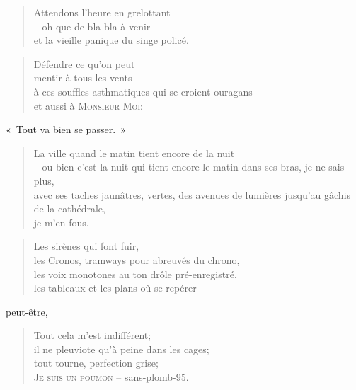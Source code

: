   \begin{verse}
    Attendons l’heure en grelottant\\
    -- oh que de bla bla à venir --\\
    et la vieille panique du singe policé.
  \end{verse}
  \begin{verse}
    Défendre ce qu’on peut\\
    mentir à tous les vents\\
    à ces souffles asthmatiques qui se croient ouragans\\
    et aussi à \textsc{Monsieur Moi}:
  \end{verse}
  \begin{center}
    «~Tout va bien se passer.~»
  \end{center}
  \begin{verse}
    La ville quand le matin tient encore de la nuit \\
    -- ou bien c’est la nuit qui tient encore le matin dans ses bras, je ne sais plus,\\
    avec ses taches jaunâtres, vertes, des avenues de lumières jusqu’au gâchis de la cathédrale,\\
    je m’en fous.
  \end{verse}
  \begin{verse}
    Les sirènes qui font fuir,\\
    les Cronos, tramways pour abreuvés du chrono,\\
    les voix monotones au ton drôle pré-enregistré,\\
    les tableaux et les plans où se repérer
  \end{verse}
  \begin{center}
    peut-être,
  \end{center}
  \begin{verse}
    Tout cela m’est indifférent;\\
    il ne pleuviote qu’à peine dans les cages;\\
    tout tourne, perfection grise;\\
    \textsc{Je suis un poumon} -- sans-plomb-95.\\
  \end{verse}

